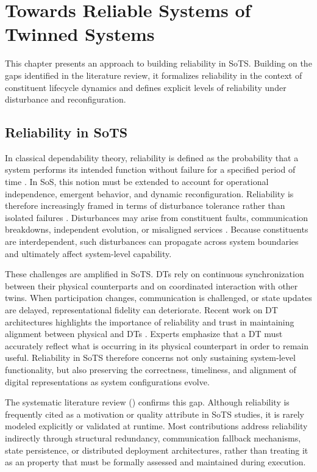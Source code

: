 \chapter{Towards Reliable Systems of Twinned Systems}\label{ch:approach}

This chapter presents an approach to building reliability in SoTS. Building on the gaps identified in the literature review, it formalizes reliability in the context of constituent lifecycle dynamics and defines explicit levels of reliability under disturbance and reconfiguration.


\section{Reliability in SoTS}
In classical dependability theory, reliability is defined as the probability that a system performs its intended function without failure for a specified period of time \cite{avizienis2004basic}. In SoS, this notion must be extended to account for operational independence, emergent behavior, and dynamic reconfiguration. Reliability is therefore increasingly framed in terms of disturbance tolerance rather than isolated failures \cite{ferreira2023towards}. Disturbances may arise from constituent faults, communication breakdowns, independent evolution, or misaligned services \cite{ferreira2021reliability}. Because constituents are interdependent, such disturbances can propagate across system boundaries and ultimately affect system-level capability.

These challenges are amplified in SoTS. DTs rely on continuous synchronization between their physical counterparts and on coordinated interaction with other twins. When participation changes, communication is challenged, or state updates are delayed, representational fidelity can deteriorate.  Recent work on DT architectures highlights the importance of reliability and trust in maintaining alignment between physical and DTs \cite{ferko2022architecting}. Experts emphasize that a DT must accurately reflect what is occurring in its physical counterpart in order to remain useful.  Reliability in SoTS therefore concerns not only sustaining system-level functionality, but also preserving the correctness, timeliness, and alignment of digital representations as system configurations evolve.

The systematic literature review () confirms this gap. Although reliability is frequently cited as a motivation or quality attribute in SoTS studies, it is rarely modeled explicitly or validated at runtime. Most contributions address reliability indirectly through structural redundancy, communication fallback mechanisms, state persistence, or distributed deployment architectures, rather than treating it as an property that must be formally assessed and maintained during execution.


